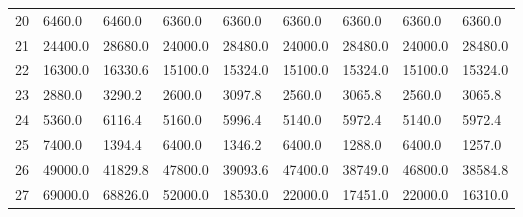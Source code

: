 \begin{tabular}{|r|l|l|l|l|l|l|l|l|}
  20 & 6460.0 & 6460.0 & 6360.0 & 6360.0 & 6360.0 & 6360.0 & 6360.0 & 6360.0 \\ 
  21 & 24400.0 & 28680.0 & 24000.0 & 28480.0 & 24000.0 & 28480.0 & 24000.0 & 28480.0 \\ 
  22 & 16300.0 & 16330.6 & 15100.0 & 15324.0 & 15100.0 & 15324.0 & 15100.0 & 15324.0 \\ 
  23 & 2880.0 & 3290.2 & 2600.0 & 3097.8 & 2560.0 & 3065.8 & 2560.0 & 3065.8 \\ 
  24 & 5360.0 & 6116.4 & 5160.0 & 5996.4 & 5140.0 & 5972.4 & 5140.0 & 5972.4 \\ 
  25 & 7400.0 & 1394.4 & 6400.0 & 1346.2 & 6400.0 & 1288.0 & 6400.0 & 1257.0 \\ 
  26 & 49000.0 & 41829.8 & 47800.0 & 39093.6 & 47400.0 & 38749.0 & 46800.0 & 38584.8 \\ 
  27 & 69000.0 & 68826.0 & 52000.0 & 18530.0 & 22000.0 & 17451.0 & 22000.0 & 16310.0 \\ 
\end{tabular}
